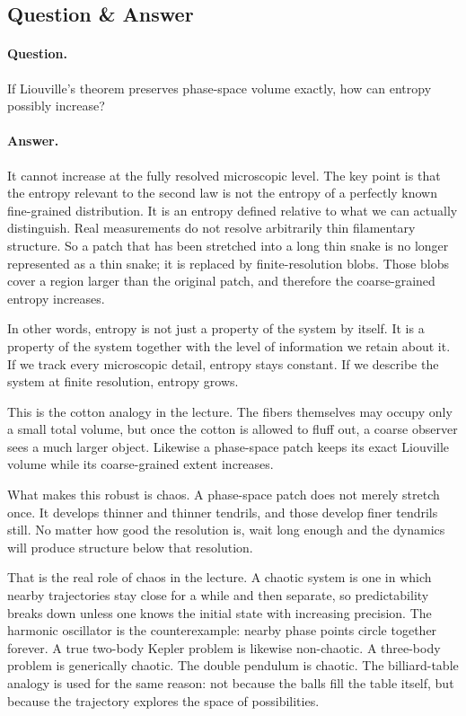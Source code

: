 \subsection{Question \& Answer}

\paragraph{Question.} If Liouville's theorem preserves phase-space volume exactly, how can entropy possibly increase?

\paragraph{Answer.} It cannot increase at the fully resolved microscopic level. The key point is that the entropy relevant to the second law is not the entropy of a perfectly known fine-grained distribution. It is an entropy defined relative to what we can actually distinguish. Real measurements do not resolve arbitrarily thin filamentary structure. So a patch that has been stretched into a long thin snake is no longer represented as a thin snake; it is replaced by finite-resolution blobs. Those blobs cover a region larger than the original patch, and therefore the coarse-grained entropy increases.

In other words, entropy is not just a property of the system by itself. It is a property of the system together with the level of information we retain about it. If we track every microscopic detail, entropy stays constant. If we describe the system at finite resolution, entropy grows.

This is the cotton analogy in the lecture. The fibers themselves may occupy only a small total volume, but once the cotton is allowed to fluff out, a coarse observer sees a much larger object. Likewise a phase-space patch keeps its exact Liouville volume while its coarse-grained extent increases.

What makes this robust is chaos. A phase-space patch does not merely stretch once. It develops thinner and thinner tendrils, and those develop finer tendrils still. No matter how good the resolution is, wait long enough and the dynamics will produce structure below that resolution.

That is the real role of chaos in the lecture. A chaotic system is one in which nearby trajectories stay close for a while and then separate, so predictability breaks down unless one knows the initial state with increasing precision. The harmonic oscillator is the counterexample: nearby phase points circle together forever. A true two-body Kepler problem is likewise non-chaotic. A three-body problem is generically chaotic. The double pendulum is chaotic. The billiard-table analogy is used for the same reason: not because the balls fill the table itself, but because the trajectory explores the space of possibilities.

